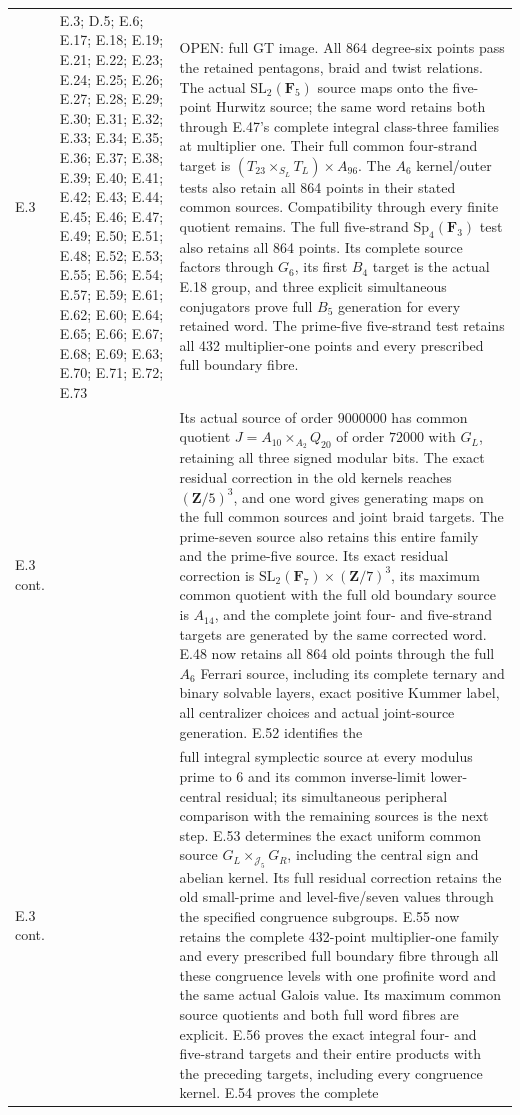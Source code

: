 \begin{longtable}{@{}p{1.1cm}p{3.0cm}p{10.3cm}@{}}
E.3 & E.3; D.5; E.6; E.17; E.18; E.19; E.21; E.22; E.23; E.24; E.25; E.26; E.27; E.28; E.29; E.30; E.31; E.32; E.33; E.34; E.35; E.36; E.37; E.38; E.39; E.40; E.41; E.42; E.43; E.44; E.45; E.46; E.47; E.49; E.50; E.51; E.48; E.52; E.53; E.55; E.56; E.54; E.57; E.59; E.61; E.62; E.60; E.64; E.65; E.66; E.67; E.68; E.69; E.63; E.70; E.71; E.72; E.73 & OPEN: full GT image. All 864 degree-six points pass the retained pentagons, braid and twist relations. The actual $\mathrm{SL}_2(\mathbf F_5)$ source maps onto the five-point Hurwitz source; the same word retains both through E.47's complete integral class-three families at multiplier one. Their full common four-strand target is $(T_{23}\times_{S_L}T_L)\times A_{96}$. The $A_6$ kernel/outer tests also retain all 864 points in their stated common sources. Compatibility through every finite quotient remains. The full five-strand $\mathrm{Sp}_4(\mathbf F_3)$ test also retains all 864 points. Its complete source factors through $G_6$, its first $B_4$ target is the actual E.18 group, and three explicit simultaneous conjugators prove full $B_5$ generation for every retained word. The prime-five five-strand test retains all 432 multiplier-one points and every prescribed full boundary fibre.  \\
E.3 cont. &  & Its actual source of order $9000000$ has common quotient $J=A_{10}\times_{A_2}Q_{20}$ of order $72000$ with $G_L$, retaining all three signed modular bits. The exact residual correction in the old kernels reaches $(\mathbf Z/5)^3$, and one word gives generating maps on the full common sources and joint braid targets. The prime-seven source also retains this entire family and the prime-five source. Its exact residual correction is $\mathrm{SL}_2(\mathbf F_7)\times(\mathbf Z/7)^3$, its maximum common quotient with the full old boundary source is $A_{14}$, and the complete joint four- and five-strand targets are generated by the same corrected word. E.48 now retains all 864 old points through the full $A_6$ Ferrari source, including its complete ternary and binary solvable layers, exact positive Kummer label, all centralizer choices and actual joint-source generation. E.52 identifies the  \\
E.3 cont. &  & full integral symplectic source at every modulus prime to 6 and its common inverse-limit lower-central residual; its simultaneous peripheral comparison with the remaining sources is the next step. E.53 determines the exact uniform common source $G_L\times_{\mathcal J_5}G_R$, including the central sign and abelian kernel. Its full residual correction retains the old small-prime and level-five/seven values through the specified congruence subgroups. E.55 now retains the complete 432-point multiplier-one family and every prescribed full boundary fibre through all these congruence levels with one profinite word and the same actual Galois value. Its maximum common source quotients and both full word fibres are explicit. E.56 proves the exact integral four- and five-strand targets and their entire products with the preceding targets, including every congruence kernel. E.54 proves the complete  \\

\end{longtable}
